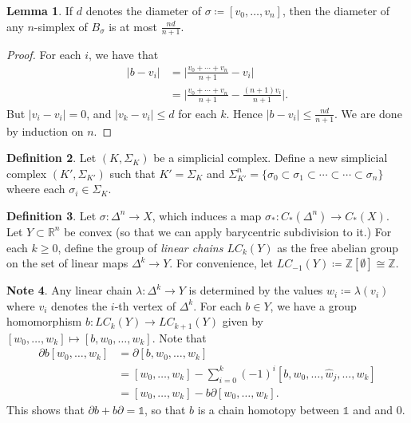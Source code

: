 \documentclass[10pt,letterpaper,cm]{nupset}
\theoremstyle{definition}
\newtheorem{definition}{Definition}[subsection]
\newtheorem{note}[definition]{Note}
\theoremstyle{theorem}
\newtheorem{lemma}[definition]{Lemma}
\theoremstyle{remark}
\newcommand{\R}{\mathbb{R}}
\newcommand{\Z}{\mathbb Z}
\newcommand{\1}{\mathbb{1}}
\newcommand{\0}{\vec 0}
\begin{document}
\begin{lemma}
If $d$ denotes the diameter of $\sigma\coloneqq  [v_0, \ldots, v_n]$, then the diameter of any $n$-simplex of $B_{\sigma}$ is at most $\frac{nd}{n+1}$.
\end{lemma}
\begin{proof}
For each $i$, we have that
\begin{align*} |b - v_i | & = \big |\frac{v_0 + \cdots + v_n}{n+1} - v_i \big |
\\ & = \big  |\frac{v_0 + \cdots + v_n}{n+1} - \frac{(n+1)v_i}{n+1}  \big | .
\end{align*}
But $|v_i - v_i|=0$, and $|v_k - v_i| \leq d$ for each $k$. Hence $ |b - v_i | \leq \frac{nd}{n+1}$. We are done by induction on $n$.
\end{proof}

\begin{definition}
Let $(K, \Sigma_K)$ be a simplicial complex. Define a new simplicial complex $(K' , \Sigma_{K'})$ such that $K' = \Sigma_K$ and $\Sigma^n_{K'} = \{\sigma_0 \subset \sigma_1 \subset \cdots \subset \cdots \subset \sigma_n\}$ wheere each $\sigma_i \in \Sigma_K$.
\end{definition}

\begin{definition}
Let $\sigma : \Delta^n \to X$, which induces a map $\sigma_{\ast}: C_{\ast}(\Delta^n) \to C_{\ast}(X)$. Let $Y \subset \R^n$ be convex (so that we can apply barycentric subdivision to it.) For each $k\geq 0$, define the group of \textit{linear chains $LC_k(Y)$} as the free abelian group on the set of linear maps $\Delta^k \to Y$.  For convenience, let $LC_{-1}(Y)\coloneqq  \Z[\emptyset] \cong \Z$.
\end{definition}

\begin{note}
Any linear chain $\lambda: \Delta^k \to Y$ is determined by the values $w_i \coloneqq  \lambda(v_i)$ where $v_i$ denotes the $i$-th vertex of $\Delta^k$. For each $b\in Y$, we have a group homomorphism $b: LC_k(Y) \to LC_{k+1}(Y)$ given by $[w_0, \ldots, w_k] \mapsto [b, w_0, \ldots, w_k]$. Note that 
\begin{align*} \partial{b[w_0, \ldots, w_k]} & =  \partial{[b, w_0, \ldots, w_k]}
\\ & = [w_0, \ldots, w_k] - \sum_{i=0}^k (-1)^i[b, w_0, \ldots, \hat{w}_j, \ldots, w_k]
\\ & = [w_0, \ldots, w_k] - b{\partial{[w_0, \ldots, w_k]}}.
\end{align*}
This shows that $\partial{b} + b{\partial} =\1$, so that $b$ is a chain homotopy between $\1$ and and $0$.
\end{note}
\end{document}
